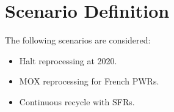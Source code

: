 \section{Scenario Definition}
The following scenarios are considered: 
\begin{itemize}
	\item Halt reprocessing at 2020.
	\item \gls{MOX} reprocessing for French \gls{PWR}s.
	\item Continuous recycle with \gls{SFR}s.
\end{itemize}
